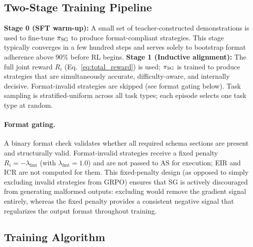 \documentclass[11pt]{article}
\newcommand{\sg}{\textnormal{\textsc{SG}}}
\newcommand{\as}{\textnormal{\textsc{AS}}}
\begin{document}
\FloatBarrier
\subsection{Two-Stage Training Pipeline}

\textbf{Stage 0 (SFT warm-up):} A small set of teacher-constructed demonstrations is used to fine-tune $\pi_{\sg{}}$ to produce format-compliant strategies.
This stage typically converges in a few hundred steps and serves solely to bootstrap format adherence above 90\% before RL begins.
\textbf{Stage 1 (Inductive alignment):} The full joint reward $R_i$ (Eq.~\eqref{eq:total_reward}) is used; $\pi_{\sg{}}$ is trained to produce strategies that are simultaneously accurate, difficulty-aware, and internally decisive. Format-invalid strategies are skipped (see format gating below).
Task sampling is stratified-uniform across all task types; each episode selects one task type at random.

\paragraph{Format gating.} A binary format check validates whether all required schema sections are present and structurally valid. Format-invalid strategies receive a fixed penalty $R_i = -\lambda_\text{fmt}$ (with $\lambda_\text{fmt} = 1.0$) and are not passed to \as{} for execution; EIR and ICR are not computed for them. This fixed-penalty design (as opposed to simply excluding invalid strategies from GRPO) ensures that \sg{} is actively discouraged from generating malformed outputs: excluding would remove the gradient signal entirely, whereas the fixed penalty provides a consistent negative signal that regularizes the output format throughout training.

\subsection{Training Algorithm}
\end{document}
